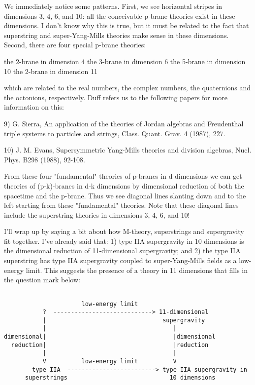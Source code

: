 We immediately notice some patterns.  First, we see horizontal stripes
in dimensions 3, 4, 6, and 10: all the conceivable p-brane theories
exist in these dimensions.  I don't know why this is true, but it must be
related to the fact that superstring and super-Yang-Mills theories make
sense in these dimensions.  Second, there are four special p-brane
theories:

the 2-brane in dimension 4
the 3-brane in dimension 6
the 5-brane in dimension 10
the 2-brane in dimension 11

which are related to the real numbers, the complex numbers, the
quaternions and the octonions, respectively.  Duff refers us to the
following papers for more information on this:

9) G. Sierra, An application of the theories of Jordan algebras and
Freudenthal triple systems to particles and strings, Class. Quant. 
Grav. 4 (1987), 227.

10) J. M. Evans, Supersymmetric Yang-Mills theories and division
algebras, Nucl. Phys. B298 (1988), 92-108.

From these four "fundamental" theories of p-branes in d dimensions we
can get theories of (p-k)-branes in d-k dimensions by dimensional
reduction of both the spacetime and the p-brane.  Thus we see diagonal
lines slanting down and to the left starting from these "fundamental"
theories.  Note that these diagonal lines include the superstring
theories in dimensions 3, 4, 6, and 10!

I'll wrap up by saying a bit about how M-theory, superstrings and
supergravity fit together.  I've already said that: 1) type IIA
supergravity in 10 dimensions is the dimensional reduction of
11-dimensional supergravity; and 2) the type IIA superstring has type
IIA supergravity coupled to super-Yang-Mills fields as a low-energy
limit.  This suggests the presence of a theory in 11 dimensions that
fills in the question mark below:


\begin{verbatim}

                      low-energy limit
           ?  ----------------------------> 11-dimensional 
           |                                 supergravity
           |                                    |
dimensional|                                    |dimensional 
  reduction|                                    |reduction
           |                                    |
           V          low-energy limit          V
        type IIA  -------------------------> type IIA supergravity in 
      superstrings                             10 dimensions 

\end{verbatim}
    
